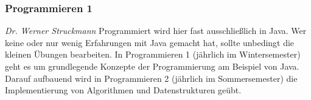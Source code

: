 \subsubsection{Programmieren 1}
	\textit{Dr. Werner Struckmann}
	Programmiert wird hier fast ausschließlich in Java. Wer keine oder nur wenig Erfahrungen mit Java gemacht hat, sollte unbedingt die kleinen Übungen bearbeiten.
	In Programmieren 1 (jährlich im Wintersemester) geht es um grundlegende Konzepte der Programmierung am Beispiel von Java. Darauf aufbauend wird in Programmieren 2 (jährlich im 	Sommersemester) die Implementierung von Algorithmen und Datenstrukturen geübt. 